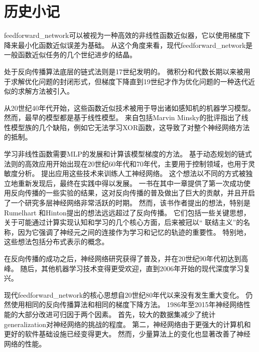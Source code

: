 \section{历史小记}
\label{sec:historical_notes}

\gls{feedforward_network}可以被视为一种高效的非线性函数近似器，它以使用梯度下降来最小化函数近似误差为基础。
从这个角度来看，现代\gls{feedforward_network}是一般函数近似任务的几个世纪进步的结晶。
  
  
处于反向传播算法底层的链式法则是17世纪发明的\citep{Leibniz-1676,LHopital-1696}。
微积分和代数长期以来被用于求解优化问题的封闭形式，但梯度下降直到19世纪才作为优化问题的一种迭代近似的求解方法被引入\citep{cauchy1847}。

从20世纪40年代开始，这些函数近似技术被用于导出诸如感知机的机器学习模型。 
然而，最早的模型都是基于线性模型。 
来自包括Marvin Minsky的批评指出了线性模型族的几个缺陷，例如它无法学习XOR函数，这导致了对整个神经网络方法的抵制。

学习非线性函数需要\gls{MLP}的发展和计算该模型梯度的方法。
基于动态规划的链式法则的高效应用开始出现在20世纪60年代和70年代，主要用于控制领域\citep{Kelley-1960,Bryson-et-al-1961,Dreyfus-1962,Bryson-1969,Dreyfus-1973}，也用于灵敏度分析\citep{Linnainmaa-1976}。 
\cite{Werbos-1981}提出应用这些技术来训练人工神经网络。
这个想法以不同的方式被独立地重新发现后\citep{LeCun85,Parker-1985,Rumelhart86b-small}，最终在实践中得以发展。
一书在其中一章提供了第一次成功使用反向传播的一些实验的结果\citep{Rumelhart86c}，这对反向传播的普及做出了巨大的贡献，并且开启了一个研究多层神经网络非常活跃的时期。
然而，该书作者提出的想法，特别是Rumelhart 和Hinton提出的想法远远超过了反向传播。
它们包括一些关键思想，关于可能通过计算实现认知和学习的几个核心方面，后来被冠以`` 联结主义''的名称，因为它强调了神经元之间的连接作为学习和记忆的轨迹的重要性。
特别地，这些想法包括分布式表示的概念\citep{Hinton-et-al-PDP1986}。

在反向传播的成功之后，神经网络研究获得了普及，并在20世纪90年代初达到高峰。 
随后，其他机器学习技术变得更受欢迎，直到2006年开始的现代深度学习复兴。

现代\gls{feedforward_network}的核心思想自20世纪80年代以来没有发生重大变化。
仍然使用相同的反向传播算法和相同的梯度下降方法。
1986年至2015年神经网络性能的大部分改进可归因于两个因素。
首先，较大的数据集减少了统计\gls{generalization}对神经网络的挑战的程度。
第二，神经网络由于更强大的计算机和更好的软件基础设施已经变得更大。
然而，少量算法上的变化也显著改善了神经网络的性能。
  
